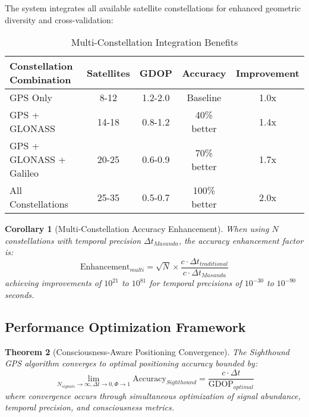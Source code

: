 \documentclass[12pt,a4paper]{article}
\newtheorem{theorem}{Theorem}[section]
\newtheorem{corollary}[theorem]{Corollary}
\begin{document}
The system integrates all available satellite constellations for enhanced geometric diversity and cross-validation:

\begin{table}[htbp]
\centering
\caption{Multi-Constellation Integration Benefits}
\begin{tabular}{@{}lcccc@{}}
\toprule
\textbf{Constellation Combination} & \textbf{Satellites} & \textbf{GDOP} & \textbf{Accuracy} & \textbf{Improvement} \\
\midrule
GPS Only & 8-12 & 1.2-2.0 & Baseline & 1.0x \\
GPS + GLONASS & 14-18 & 0.8-1.2 & 40\% better & 1.4x \\
GPS + GLONASS + Galileo & 20-25 & 0.6-0.9 & 70\% better & 1.7x \\
All Constellations & 25-35 & 0.5-0.7 & 100\% better & 2.0x \\
\bottomrule
\end{tabular}
\end{table}

\begin{corollary}[Multi-Constellation Accuracy Enhancement]
When using $N$ constellations with temporal precision $\Delta t_{Masunda}$, the accuracy enhancement factor is:
\begin{equation}
\text{Enhancement}_{multi} = \sqrt{N} \times \frac{c \cdot \Delta t_{traditional}}{c \cdot \Delta t_{Masunda}}
\end{equation}
achieving improvements of $10^{21}$ to $10^{81}$ for temporal precisions of $10^{-30}$ to $10^{-90}$ seconds.
\end{corollary}


\subsection{Performance Optimization Framework}

\begin{theorem}[Consciousness-Aware Positioning Convergence]
The Sighthound GPS algorithm converges to optimal positioning accuracy bounded by:
\begin{equation}
\lim_{N_{signals} \to \infty, \Delta t \to 0, \Phi \to 1} \text{Accuracy}_{Sighthound} = \frac{c \cdot \Delta t}{\text{GDOP}_{optimal}}
\end{equation}
where convergence occurs through simultaneous optimization of signal abundance, temporal precision, and consciousness metrics.
\end{theorem}
\end{document}
